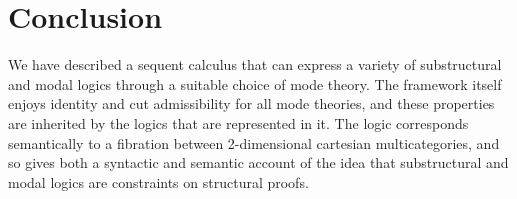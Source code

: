 \section{Conclusion}

We have described a sequent calculus that can express a variety of
substructural and modal logics through a suitable choice of mode theory.
The framework itself enjoys identity and cut admissibility for all mode
theories, and these properties are inherited by the logics that are
represented in it.  The logic corresponds semantically to a fibration
between 2-dimensional cartesian multicategories, and so gives both a
syntactic and semantic account of the idea that substructural and modal
logics are constraints on structural proofs.  

